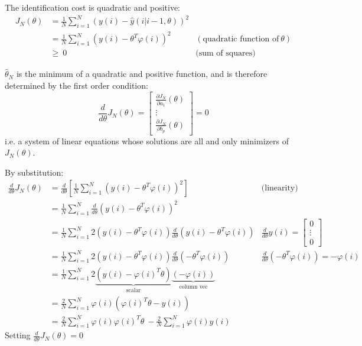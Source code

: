 The identification cost is quadratic and positive:		
\begin{align*}
J_{N}( \theta ) & =\frac{1}{N}\sum _{i=1}^{N}( y( i) -\hat{y}( i|i-1,\theta ))^{2} & \\
 & =\frac{1}{N}\sum _{i=1}^{N}\left( y( i) -\theta ^{T} \varphi ( i)\right)^{2} & (\text{quadratic function of} \ \theta) \\
 & \geq \ 0 & \text{(sum of squares)}
\end{align*}


$ \hat{\theta }_{N}$ is the minimum of a quadratic and positive function, and is therefore determined by the first order condition:
\begin{equation*}
\frac{d}{d\theta } J_{N}( \theta ) =\begin{bmatrix}
\frac{\partial J_{N}}{\partial a_{1}}( \theta )\\
\vdots \\
\frac{\partial J_{N}}{\partial b_{p}}( \theta )
\end{bmatrix} =0
\end{equation*}
i.e. a system of linear equations whose solutions are all and only minimizers of $ J_{N}( \theta )$.

By substitution:
\begin{equation*}
\begin{aligned}
\frac{d}{d\theta } J_{N}( \theta ) & =\frac{d}{d\theta }[\frac{1}{N}\sum _{i=1}^{N}\left( y( i) -\theta ^{T} \varphi ( i)\right)^{2}] & \text{(linearity)}\\
 & =\frac{1}{N}\sum _{i=1}^{N}\frac{d}{d\theta }\left( y( i) -\theta ^{T} \varphi ( i)\right)^{2} & \\
 & =\frac{1}{N}\sum _{i=1}^{N} 2\left( y( i) -\theta ^{T} \varphi ( i)\right)\frac{d}{d\theta }\left( y( i) -\theta ^{T} \varphi ( i)\right) & \frac{d}{d\theta } y( i) =\begin{bmatrix}
0\\
\vdots \\
0
\end{bmatrix}\\
 & =\frac{1}{N}\sum _{i=1}^{N} 2\left( y( i) -\theta ^{T} \varphi ( i)\right)\frac{d}{d\theta }\left( -\theta ^{T} \varphi ( i)\right) & \frac{d}{d\theta }\left( -\theta ^{T} \varphi ( i)\right) =-\varphi ( i)\\
 & =\frac{1}{N}\sum _{i=1}^{N} 2\underbrace{\left( y( i) -\varphi ( i)^{T} \theta \right)}_{\text{scalar}}\underbrace{( -\varphi ( i))}_{\text{column vec}} & \\
 & =\frac{2}{N}\sum _{i=1}^{N} \varphi ( i)\left( \varphi ( i)^{T} \theta -y( i)\right) & \\
 & =\frac{2}{N}\sum _{i=1}^{N} \varphi ( i) \varphi ( i)^{T} \theta \ -\frac{2}{N}\sum _{i=1}^{N} \varphi ( i) y( i) & 
\end{aligned} \ 
\end{equation*}
Setting $ \frac{d}{d\theta } J_{N}( \theta ) =0$	


